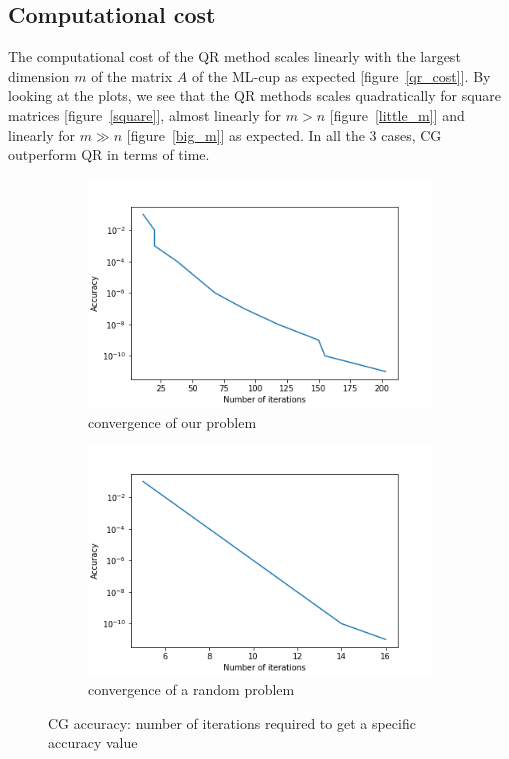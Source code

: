 \documentclass{article}
\begin{document}
\subsection{Computational cost}\label{subsec:computational-cost}
The computational cost of the QR method scales linearly with the largest dimension $m$ of the matrix $A$ of the ML-cup as expected [figure~\ref{qr_cost}].
By looking at the plots, we see that the QR methods scales quadratically for square matrices [figure~\ref{square}], almost linearly for $m>n$ [figure~\ref{little_m}] and linearly for $m\gg n$ [figure~\ref{big_m}] as expected.
In all the 3 cases, CG outperform QR in terms of time.
         \begin{figure}
		\centering
		\begin{subfigure}{.5\textwidth}
  		\centering
 		 \includegraphics[width=\textwidth]{../results/cg_accuracy.png}
  		\caption{convergence of our problem}
  		\label{cg_acc1}
		\end{subfigure}%
		\begin{subfigure}{.5\textwidth}
 		 \centering
 		 \includegraphics[width=\textwidth]{../results/cg_accuracy_rand.png}
 		 \caption{convergence of a random problem}
 		 \label{cg_acc2}
		\end{subfigure}
		\caption{CG accuracy: number of iterations required to get a specific accuracy value }
		\label{cg_acc}
	\end{figure}
\end{document}
